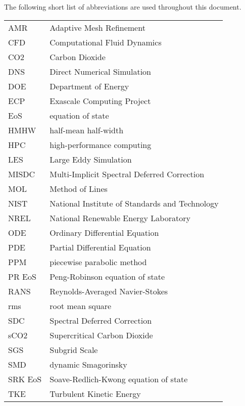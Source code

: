 \documentclass[11pt,expanded,copyright]{fsuthesis}
\begin{document}
\begin{listofabbrevs}
The following short list of abbreviations are used throughout this document. 
\begin{center}
\begin{tabular}{ll}
AMR& Adaptive Mesh Refinement \\
CFD& Computational Fluid Dynamics \\
CO2& Carbon Dioxide \\
DNS& Direct Numerical Simulation \\
DOE& Department of Energy \\
ECP& Exascale Computing Project \\
EoS& equation of state \\
HMHW& half-mean half-width \\
HPC& high-performance computing \\
LES& Large Eddy Simulation \\
MISDC& Multi-Implicit Spectral Deferred Correction \\
MOL& Method of Lines \\
NIST& National Institute of Standards and Technology \\
NREL& National Renewable Energy Laboratory \\
ODE& Ordinary Differential Equation \\
PDE& Partial Differential Equation \\
PPM& piecewise parabolic method \\
PR EoS& Peng-Robinson equation of state \\
RANS& Reynolds-Averaged Navier-Stokes \\
rms& root mean square \\
SDC& Spectral Deferred Correction \\
sCO2& Supercritical Carbon Dioxide \\
SGS& Subgrid Scale \\
SMD& dynamic Smagorinsky \\
SRK EoS& Soave-Redlich-Kwong equation of state \\
TKE& Turbulent Kinetic Energy \\





\end{tabular}
\end{center}
\end{listofabbrevs}
\end{document}
